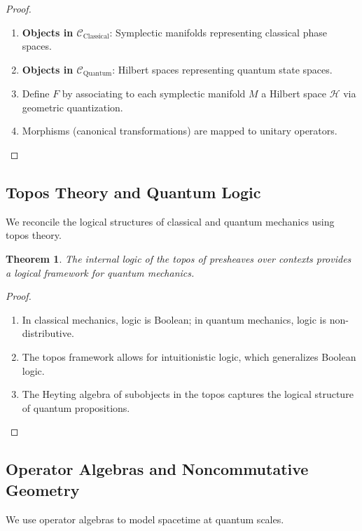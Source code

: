 \documentclass[12pt]{article}
\newtheorem{theorem}{Theorem}[section]
\begin{document}
\begin{proof}
\leavevmode
\begin{enumerate}[label=\arabic*.]
    \item \textbf{Objects in $\mathcal{C}_{\text{Classical}}$}: Symplectic manifolds representing classical phase spaces.
    \item \textbf{Objects in $\mathcal{C}_{\text{Quantum}}$}: Hilbert spaces representing quantum state spaces.
    \item Define $F$ by associating to each symplectic manifold $M$ a Hilbert space $\mathcal{H}$ via geometric quantization.
    \item Morphisms (canonical transformations) are mapped to unitary operators.
\end{enumerate}
\end{proof}

\subsection{Topos Theory and Quantum Logic}

We reconcile the logical structures of classical and quantum mechanics using topos theory.

\begin{theorem}
The internal logic of the topos of presheaves over contexts provides a logical framework for quantum mechanics.
\end{theorem}

\begin{proof}
\leavevmode
\begin{enumerate}[label=\arabic*.]
    \item In classical mechanics, logic is Boolean; in quantum mechanics, logic is non-distributive.
    \item The topos framework allows for intuitionistic logic, which generalizes Boolean logic.
    \item The Heyting algebra of subobjects in the topos captures the logical structure of quantum propositions.
\end{enumerate}
\end{proof}

\subsection{Operator Algebras and Noncommutative Geometry}

We use operator algebras to model spacetime at quantum scales.
\end{document}
